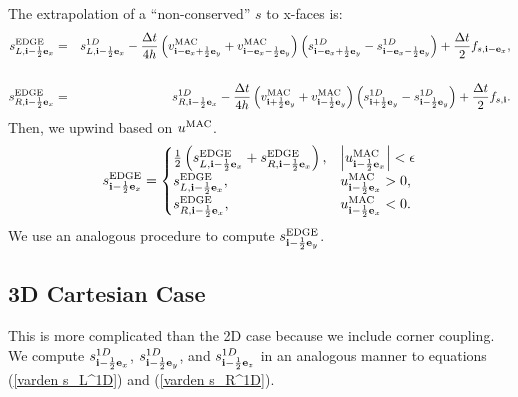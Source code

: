 \documentclass[11pt]{article}
\def\half  {\frac{1}{2}}
\def\dt    {\Delta t}
\def\edge  {\rm EDGE}
\def\mac   {\rm MAC}
\def\eb    {{\bf e}}
\def\ib    {{\bf i}}
\begin{document}
The extrapolation of a ``non-conserved'' $s$ to x-faces is:
\begin{eqnarray}
s_{L,\ib-\half\eb_x}^{\edge} &=& s_{L,\ib-\half\eb_x}^{1D} - \frac{\dt}{4h}\left(v_{\ib-\eb_x+\half\eb_y}^{\mac}+v_{\ib-\eb_x-\half\eb_y}^{\mac}\right)\left(s_{\ib-\eb_x+\half\eb_y}^{1D} - s_{\ib-\eb_x-\half\eb_y}^{1D}\right) + \frac{\dt}{2}f_{s,\ib-\eb_x}, \nonumber \\
&& \\
s_{R,\ib-\half\eb_x}^{\edge} &=& s_{R,\ib-\half\eb_x}^{1D} - \frac{\dt}{4h}\left(v_{\ib+\half\eb_y}^{\mac}+v_{\ib-\half\eb_y}^{\mac}\right)\left(s_{\ib+\half\eb_y}^{1D} - s_{\ib-\half\eb_y}^{1D}\right) + \frac{\dt}{2}f_{s,\ib}.
\end{eqnarray}
Then, we upwind based on $u^{\mac}$.
\begin{equation}
s_{\ib-\half\eb_x}^{\edge} =
\begin{cases}
\half\left(s_{L,\ib-\half\eb_x}^{\edge} + s_{R,\ib-\half\eb_x}^{\edge}\right), & \left|u^{\mac}_{\ib-\half\eb_x}\right| < \epsilon \\
s_{L,\ib-\half\eb_x}^{\edge}, & u^{\mac}_{\ib-\half\eb_x} > 0, \\
s_{R,\ib-\half\eb_x}^{\edge}, & u^{\mac}_{\ib-\half\eb_x} < 0.
\end{cases}
\end{equation}
We use an analogous procedure to compute $s_{\ib-\half\eb_y}^{\edge}$.
\subsection{3D Cartesian Case}
This is more complicated than the 2D case because we include corner coupling.  We compute $s_{\ib-\half\eb_x}^{1D}$, $s_{\ib-\half\eb_y}^{1D}$, and $s_{\ib-\half\eb_z}^{1D}$ in an analogous manner to equations (\ref{varden s_L^1D}) and (\ref{varden s_R^1D}).
\end{document}
